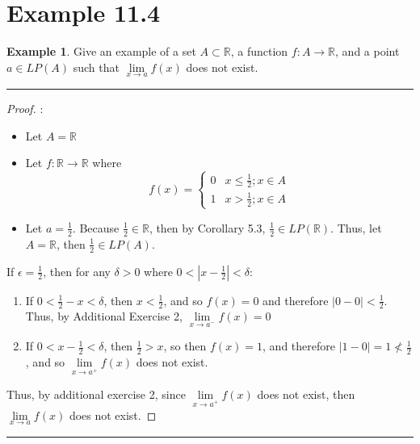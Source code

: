 \documentclass[openany, amssymb, psamsfonts]{amsart}
\newcommand{\bbR}{\mathbb{R}}
\newcommand{\arr}{\longrightarrow}
\theoremstyle{definition}
\newtheorem{exmp}{Example}[section]
\numberwithin{equation}{section}
\begin{document}
\section*{Example 11.4}
\begin{exmp}
\label{11.4}
Give an example of a set $A \subset \bbR$, a function $f\colon A \to \bbR$, and a point $a \in LP(A)$ such that $\lim\limits_{x \to a} f(x)$ does not exist.
\end{exmp}
 \vspace{4pt}     \hrule   \vspace{4pt}\begin{proof}:\\
\begin{itemize}
\item Let $A = \bbR$
\item Let $f\colon \bbR \arr \bbR$ where \[f(x) = \begin{cases} 
          0 & x \leq \frac{1}{2} ; x\in A \\
          1 & x> \frac{1}{2} ; x\in A
       \end{cases}
    \] 
\item Let $a = \frac{1}{2}$. Because $\frac{1}{2}\in \bbR$, then by Corollary 5.3, $\frac{1}{2}\in LP(\bbR)$. Thus, let $A = \bbR$, then $\frac{1}{2}\in LP(A)$.
\end{itemize}
If $\epsilon = \frac{1}{2}$, then for any $\delta >0$ where $0<|x-\frac{1}{2}|<\delta$:
\begin{enumerate}
\item If $0<\frac{1}{2}-x<\delta$, then $x<\frac{1}{2}$, and so $f(x) = 0$ and therefore $|0-0|<\frac{1}{2}$. Thus, by Additional Exercise 2, $\lim\limits_{x\to a^-}f(x) = 0$
\item If $0<x-\frac{1}{2}<\delta$, then $\frac{1}{2} > x$, so then $f(x) = 1$, and therefore $|1-0| = 1 \not < \frac{1}{2}$, and so $\lim\limits_{x\to a^+}f(x)$ does not exist. 
\end{enumerate}
Thus, by additional exercise 2, since $\lim\limits_{x\to a^+}f(x)$ does not exist, then $\lim\limits_{x\to a}f(x)$ does not exist.
\end{proof} \vspace{4pt}     \hrule   \vspace{4pt}
\end{document}
